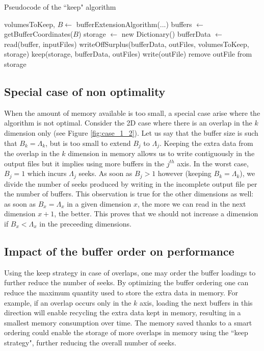 \documentclass[conference]{IEEEtran}
\begin{document}
\begin{algorithm}[h]
  \caption{Pseudocode of the ``keep" algorithm}

  \begin{algorithmic}[1]
  \STATE volumesToKeep, $B \leftarrow$ bufferExtensionAlgorithm(...)
  \STATE buffers $\leftarrow$ getBufferCoordinates($B$)
  \STATE storage $\leftarrow$ new Dictionary()
    \STATE bufferData $\leftarrow$ read(buffer, inputFiles)
    \STATE writeOffSurplus(bufferData, outFiles, volumesToKeep, storage)
    \STATE keep(storage, bufferData, outFiles)
        \STATE write(outFile)
        \STATE remove outFile from storage
      \ENDIF
    \ENDFOR
  \ENDFOR
  \end{algorithmic}
  \label{algo:keep_algorithm}

\end{algorithm}

\subsection{Special case of non optimality}
When the amount of memory available is too small, a special case arise where the algorithm is not optimal.
Consider the 2D case where there is an overlap in the $k$ dimension only (see Figure \ref{fig:case_1_2}).
Let us say that the buffer size is such that $B_k = \Lambda_k$, but is too small to extend $B_j$ to $\Lambda_j$.
Keeping the extra data from the overlap in the $k$ dimension in memory allows us to write contiguously in the output files but it implies using more buffers in the $j^{th}$ axis.
In the worst case, $B_j = 1$ which incurs $\Lambda_j$ seeks.
As soon as $B_j > 1$ however (keeping $B_k = \Lambda_k$), we divide the number of seeks produced by writing in the incomplete output file per the number of buffers.
This observation is true for the other dimensions as well: as soon as $B_x = \Lambda_x$ in a given dimension $x$, the more we can read in the next dimension $x+1$, the better.
This proves that we should not increase a dimension if $B_x < \Lambda_x$ in the preceeding dimensions.

\subsection{Impact of the buffer order on performance}
Using the keep strategy in case of overlaps, one may order the buffer loadings to further reduce the number of seeks.
By optimizing the buffer ordering one can reduce the maximum quantity used to store the extra data in memory.
For example, if an overlap occurs only in the $k$ axis, loading the next buffers in this direction will enable recycling the extra data kept in memory, resulting in a smallest memory consumption over time.
The memory saved thanks to a smart ordering could enable the storage of more overlaps in memory using the ``keep strategy", further reducing the overall number of seeks. \\
\end{document}
